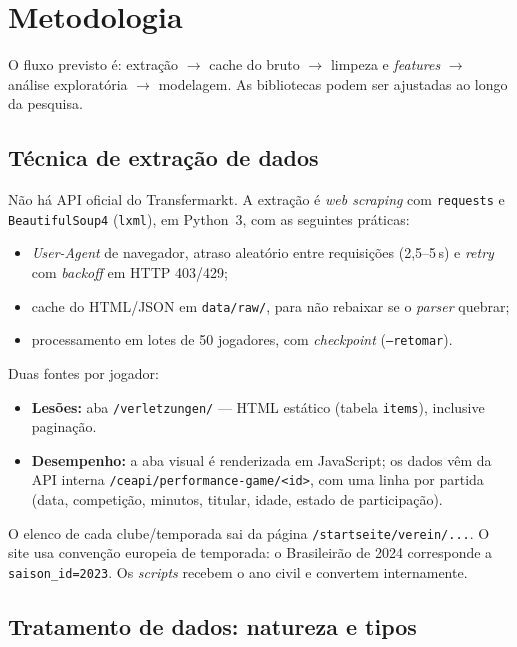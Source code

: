\documentclass[11pt,a4paper]{article}
\begin{document}
\section{Metodologia}

O fluxo previsto é: extração $\rightarrow$ cache do bruto $\rightarrow$ limpeza e \textit{features} $\rightarrow$ análise exploratória $\rightarrow$ modelagem. As bibliotecas podem ser ajustadas ao longo da pesquisa.

\subsection{Técnica de extração de dados}

Não há API oficial do Transfermarkt. A extração é \textit{web scraping} com \texttt{requests} e \texttt{BeautifulSoup4} (\texttt{lxml}), em Python~3, com as seguintes práticas:

\begin{itemize}
  \item \textit{User-Agent} de navegador, atraso aleatório entre requisições (2,5--5\,s) e \textit{retry} com \textit{backoff} em HTTP 403/429;
  \item cache do HTML/JSON em \texttt{data/raw/}, para não rebaixar se o \textit{parser} quebrar;
  \item processamento em lotes de 50 jogadores, com \textit{checkpoint} (\texttt{--retomar}).
\end{itemize}

Duas fontes por jogador:
\begin{itemize}
  \item \textbf{Lesões:} aba \texttt{/verletzungen/} --- HTML estático (tabela \texttt{items}), inclusive paginação.
  \item \textbf{Desempenho:} a aba visual é renderizada em JavaScript; os dados vêm da API interna \texttt{/ceapi/performance-game/<id>}, com uma linha por partida (data, competição, minutos, titular, idade, estado de participação).
\end{itemize}

O elenco de cada clube/temporada sai da página \texttt{/startseite/verein/...}. O site usa convenção europeia de temporada: o Brasileirão de 2024 corresponde a \texttt{saison\_id=2023}. Os \textit{scripts} recebem o ano civil e convertem internamente.

\subsection{Tratamento de dados: natureza e tipos}
\end{document}
